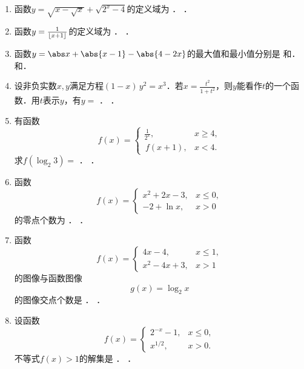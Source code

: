 \begin{enumerate}
\item 函数\(y = \sqrt{x - \sqrt{x}} + \sqrt{2^x - 4}\)的定义域为
  \ifshowsol
  \uline{}．
  \else
  \uline{\makebox[5em]{}}．
  \fi

\item 函数\(y = \frac1{\lfloor x+1\rfloor}\)的定义域为
  \ifshowsol
  \uline{}．
  \else
  \uline{\makebox[10em]{}}．
  \fi

\item 函数\(y = \abs x + \abs{x-1} - \abs{4-2x}\)的最大值和最小值分别是
  \ifshowsol
  \uline{}和\uline{}．
  \else
  \uline{\makebox[3em]{}}和\uline{\makebox[3em]{}}．
  \fi

\item 设非负实数\(x, y\)满足方程\((1-x)\,y^2 = x^3\)．若\(x = \frac{t^2}{1+t^2}\)，则\(y\)能看作\(t\)的一个函数．用\(t\)表示\(y\)，有\(y =\)
  \ifshowsol
  \uline{}．
  \else
  \uline{\makebox[6em]{}}．
  \fi

\item 有函数
  \[
    f(x) =
    \begin{cases}
      \frac1{2^x}, & x \ge 4, \\
      \,f(x+1), & x < 4.
    \end{cases}
  \]
  求\(f(\log_2 3) =\)
  \ifshowsol
  \uline{}．
  \else
  \uline{\makebox[4em]{}}．
  \fi

\item 函数
  \[
    f(x) =
    \begin{cases}
      x^2 + 2x - 3, & x \le 0, \\
      -2 + \ln x, & x > 0
    \end{cases}
  \]
  的零点个数为
  \ifshowsol
  \uline{}．
  \else
  \uline{\makebox[3em]{}}．
  \fi

\item 函数
  \[
    f(x) =
    \begin{cases}
      4x - 4, & x \le 1, \\
      x^2 - 4x + 3, & x > 1
    \end{cases}
  \]
  的图像与函数图像
  \[
    g(x) = \log_2 x
  \]
  的图像交点个数是
  \ifshowsol
  \uline{}．
  \else
  \uline{\makebox[3em]{}}．
  \fi

\item 设函数
  \[
    f(x) =
    \begin{cases}
      2^{-x} - 1, & x \le 0, \\
      x^{1/2}, & x > 0.
    \end{cases}
  \]
  不等式\(f(x) > 1\)的解集是
  \ifshowsol
  \uline{}．
  \else
  \uline{\makebox[10em]{}}．
  \fi


\end{enumerate}
